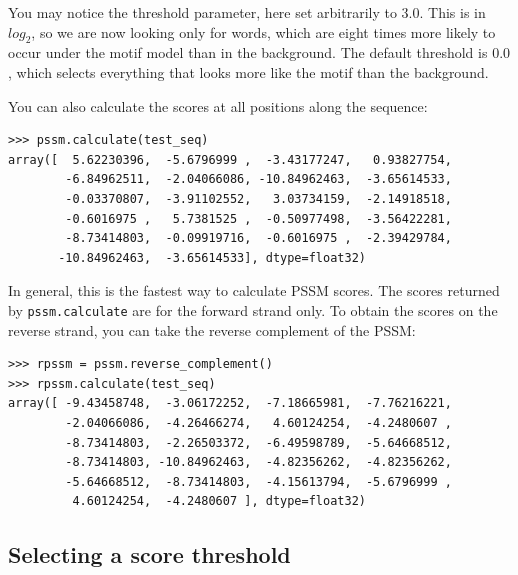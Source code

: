 \documentclass{report}
\begin{document}
You may notice the threshold parameter, here set arbitrarily to
$3.0$. This is in $log_2$, so we are now looking only for words, which
are eight times more likely to occur under the motif model than in the
background. The default threshold is $0.0$, which selects everything
that looks more like the motif than the background.

You can also calculate the scores at all positions along the sequence:
\begin{verbatim}
>>> pssm.calculate(test_seq)
array([  5.62230396,  -5.6796999 ,  -3.43177247,   0.93827754,
        -6.84962511,  -2.04066086, -10.84962463,  -3.65614533,
        -0.03370807,  -3.91102552,   3.03734159,  -2.14918518,
        -0.6016975 ,   5.7381525 ,  -0.50977498,  -3.56422281,
        -8.73414803,  -0.09919716,  -0.6016975 ,  -2.39429784,
       -10.84962463,  -3.65614533], dtype=float32)
\end{verbatim}
In general, this is the fastest way to calculate PSSM scores.
The scores returned by \verb+pssm.calculate+ are for the forward strand
only. To obtain the scores on the reverse strand, you can take the reverse
complement of the PSSM:
\begin{verbatim}
>>> rpssm = pssm.reverse_complement()
>>> rpssm.calculate(test_seq)
array([ -9.43458748,  -3.06172252,  -7.18665981,  -7.76216221,
        -2.04066086,  -4.26466274,   4.60124254,  -4.2480607 ,
        -8.73414803,  -2.26503372,  -6.49598789,  -5.64668512,
        -8.73414803, -10.84962463,  -4.82356262,  -4.82356262,
        -5.64668512,  -8.73414803,  -4.15613794,  -5.6796999 ,
         4.60124254,  -4.2480607 ], dtype=float32)
\end{verbatim}

\subsection{Selecting a score threshold}
\end{document}
